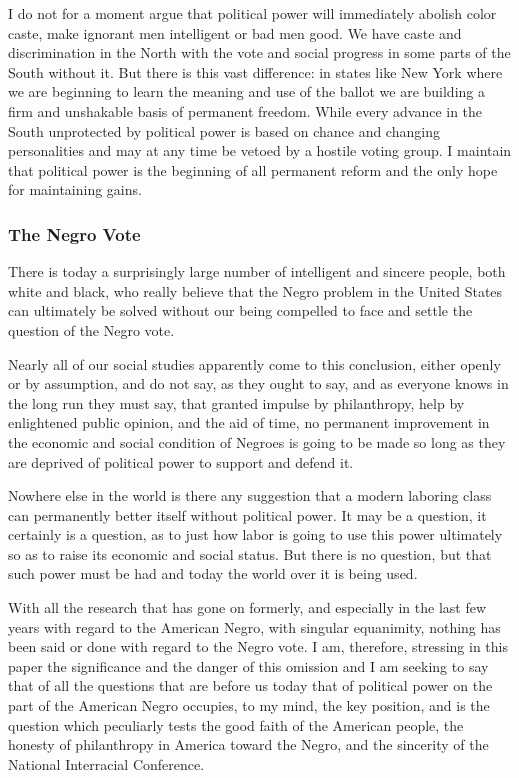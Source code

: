 \documentclass[letterpaper,10pt,english]{jupyterBook}
\begin{document}
\sphinxAtStartPar
I do not for a moment argue that political power will immediately abolish color caste, make ignorant men intelligent or bad men good. We have caste and discrimination in the North with the vote and social progress in some parts of the South without it. But there is this vast difference: in states like New York where we are beginning to learn the meaning and use of the ballot we are building a firm and unshakable basis of permanent freedom. While every advance in the South unprotected by political power is based on chance and changing personalities and may at any time be vetoed by a hostile voting group. I maintain that political power is the beginning of all permanent reform and the only hope for maintaining gains.


\subsubsection{The Negro Vote}
\label{\detokenize{Volumes/36/05/negro_citizen:the-negro-vote}}
\sphinxAtStartPar
There is today a surprisingly large number of intelligent and sincere people, both white and black, who really believe that the Negro problem in the United States can ultimately be solved without our being compelled to face and settle the question of the Negro vote.

\sphinxAtStartPar
Nearly all of our social studies apparently come to this conclusion, either openly or by assumption, and do not say, as they ought to say, and as everyone knows in the long run they must say, that granted impulse by philanthropy, help by enlightened public opinion, and the aid of time, no permanent improvement in the economic and social condition of Negroes is going to be made so long as they are deprived of political power to support and defend it.

\sphinxAtStartPar
Nowhere else in the world is there any suggestion that a modern laboring class can permanently better itself without political power. It may be a question, it certainly is a question, as to just how labor is going to use this power ultimately so as to raise its economic and social status. But there is no question, but that such power must be had and today the world over it is being used.

\sphinxAtStartPar
With all the research that has gone on formerly, and especially in the last few years with regard to the American Negro, with singular equanimity, nothing has been said or done with regard to the Negro vote. I am, therefore, stressing in this paper the significance and the danger of this omission and I am seeking to say that of all the questions that are before us today that of political power on the part of the American Negro occupies, to my mind, the key position, and is the question which peculiarly tests the good faith of the American people, the honesty of philanthropy in America toward the Negro, and the sincerity of the National Inter\sphinxhyphen{}racial Conference.
\end{document}
